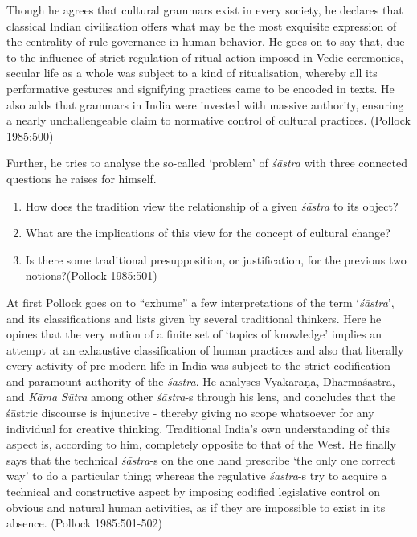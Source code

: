 Though he agrees that cultural grammars exist in every society, he declares that classical Indian civilisation offers what may be the most exquisite expression of the centrality of rule-governance in human behavior. He goes on to say that, due to the influence of strict regulation of ritual action imposed in Vedic ceremonies, secular life as a whole was subject to a kind of ritualisation, whereby all its performative gestures and signifying practices came to be encoded in texts. He also adds that grammars in India were invested with massive authority, ensuring a nearly unchallengeable claim to normative control of cultural practices. (Pollock 1985:500)

Further, he tries to analyse the so-called `problem' of {\sl śāstra} with three connected questions he raises for himself.
\begin{enumerate}
\item How does the tradition view the relationship of a given {\sl śāstra} to its object?

\newpage

\item What are the implications of this view for the concept of cultural change?

\item Is there some traditional presupposition, or justification, for the previous two notions?\hfill (Pollock 1985:501)
\end{enumerate}

At first Pollock goes on to ``exhume'' a few interpretations of the term `{\it śāstra}', and its classifications and lists given by several traditional thinkers. Here he opines that the very notion of a finite set of `topics of knowledge' implies an attempt at an exhaustive classification of human practices and also that literally every activity of pre-modern life in India was subject to the strict codification and paramount authority of the {\it śāstra}. He analyses Vyākaraṇa, Dharmaśāstra, and {\sl Kāma Sūtra} among other {\it śāstra}-s through his lens, and concludes that the śāstric discourse is injunctive - thereby giving no scope whatsoever for any individual for creative thinking. Traditional India's own understanding of this aspect is, according to him, completely opposite to that of the West. He finally says that the technical {\it śāstra}-s on the one hand prescribe `the only one correct way' to do a particular thing;  whereas the regulative {\it śāstra}-s try to acquire a technical and constructive aspect by imposing codified legislative control on obvious and natural human activities, as if they are impossible to exist in its absence. (Pollock 1985:501-502)

